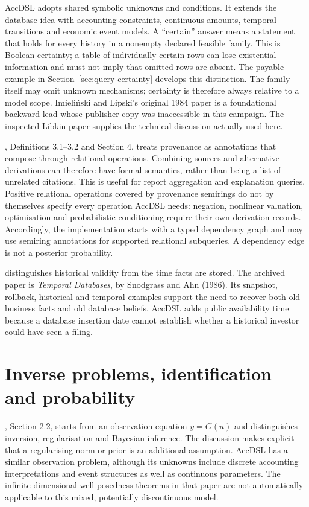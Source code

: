AccDSL adopts shared symbolic unknowns and conditions. It extends the database
idea with accounting constraints, continuous amounts, temporal transitions and
economic event models. A ``certain'' answer means a statement that holds for
every history in a nonempty declared feasible family. This is Boolean
certainty; a table of individually certain rows can lose existential
information and must not imply that omitted rows are absent. The payable
example in Section~\ref{sec:query-certainty} develops this distinction.
The family itself may omit
unknown mechanisms; certainty is therefore always relative to a model scope.
Imieliński and Lipski's original 1984 paper is a foundational backward lead
whose publisher copy was inaccessible in this campaign. The inspected Libkin
paper supplies the technical discussion actually used here.

\citet{green2007}, Definitions 3.1--3.2 and Section 4, treats provenance as
annotations that compose through relational operations. Combining sources
and alternative derivations can therefore have formal semantics, rather than
being a list of unrelated citations. This is useful for report aggregation and
explanation queries. Positive relational operations covered by provenance
semirings do not by themselves specify every operation AccDSL needs: negation,
nonlinear valuation, optimisation and probabilistic conditioning require their
own derivation records. Accordingly, the implementation starts with a typed
dependency graph and may use semiring annotations for supported relational
subqueries. A dependency edge is not a posterior probability.

\citet{snodgrass1986} distinguishes historical validity from the time facts
are stored. The archived paper is \emph{Temporal Databases}, by Snodgrass and
Ahn (1986).
Its snapshot, rollback, historical and temporal examples support the need to
recover both old business facts and old database beliefs. AccDSL adds public
availability time because a database insertion date cannot establish whether
a historical investor could have seen a filing.

\section{Inverse problems, identification and probability}

\citet{stuart2010}, Section 2.2, starts from an observation equation
$y=G(u)$ and distinguishes inversion, regularisation and Bayesian inference.
The discussion makes explicit that a regularising norm or prior is an
additional assumption. AccDSL has a similar observation problem, although
its unknowns include discrete accounting interpretations and event structures
as well as continuous parameters. The infinite-dimensional well-posedness
theorems in that paper are not automatically applicable to this mixed,
potentially discontinuous model.

